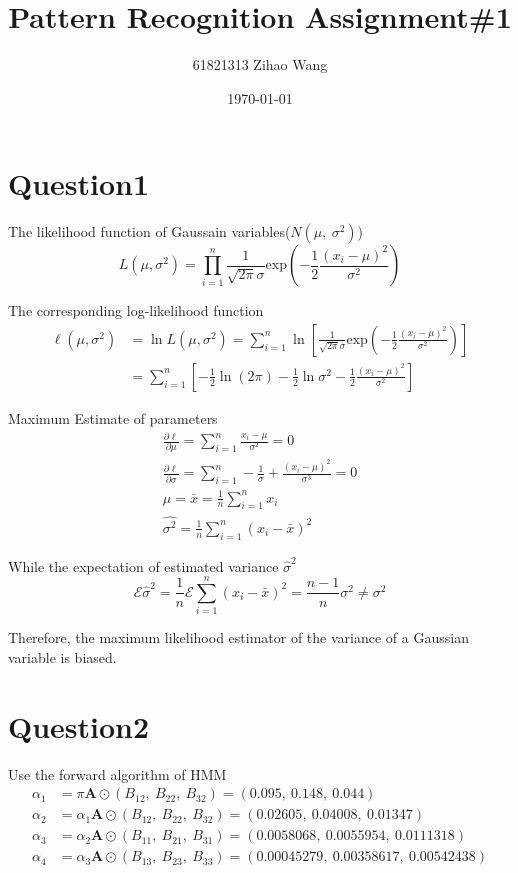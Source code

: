 \documentclass{article}
\title{Pattern Recognition Assignment\#1}
\author{61821313 Zihao Wang}
\date{\today}
\begin{document}
\maketitle

\section*{Question1}

The likelihood function of Gaussain variables($N(\mu,\ \sigma^2)$)
$$
L(\mu, \sigma^2) = \prod_{i = 1}^{n} \frac{1}{\sqrt{2\pi} \sigma} 
\mathrm{exp}(-\frac{1}{2} \frac{(x_{i} - \mu)^2}{\sigma^2})
$$

The corresponding log-likelihood function
\begin{align*}
    \ell(\mu, \sigma^2) &= \ln L(\mu, \sigma^2) = \sum_{i = 1}^{n} \ln \left[
    \frac{1}{\sqrt{2\pi}\sigma} \mathrm{exp}(-\frac{1}{2} \frac{(x_{i} - \mu)^2}{\sigma^2})
    \right] \\[5mm]
    &= \sum_{i = 1}^{n} \left[
        -\frac{1}{2}\ln(2\pi) - \frac{1}{2}\ln\sigma^2 - \frac{1}{2} \frac{(x_{i} - \mu)^2}{\sigma^2}
    \right]
\end{align*}

Maximum Estimate of parameters
\begin{gather*}
    \frac{\partial \ell}{\partial \mu} = \sum_{i = 1}^{n} 
    \frac{x_{i} - \mu}{\sigma^2} = 0 \\[5mm]
    \frac{\partial \ell}{\partial \sigma} = \sum_{i = 1}^{n} 
    -\frac{1}{\sigma} + \frac{(x_{i} - \mu)^2}{\sigma^3} = 0 \\[5mm]
    \hat{\mu} =  \bar{x} = \frac{1}{n} \sum_{i = 1}^{n} x_{i} \\[5mm]
    \hat{\sigma^2} = \frac{1}{n} \sum_{i = 1}^{n} (x_{i} - \bar{x})^2
\end{gather*}

While the expectation of estimated variance $\hat{\sigma}^2$
$$
\mathcal{E} \hat{\sigma}^2 = \frac{1}{n} \mathcal{E} \sum_{i = 1}^{n} (x_{i} - \bar{x})^2 
= \frac{n - 1}{n} \sigma^2 \ne \sigma^2
$$

Therefore, the maximum likelihood estimator of the variance of a Gaussian variable is biased.

\section*{Question2}

Use the forward algorithm of HMM
\begin{align*}
    \alpha_{1} &= \pi \mathbf{A} \odot (B_{12},\ B_{22},\ B_{32}) 
                = (0.095,\ 0.148,\ 0.044) \\[5mm]
    \alpha_{2} &= \alpha_{1} \mathbf{A} \odot (B_{12},\ B_{22},\ B_{32}) 
                = (0.02605,\ 0.04008,\ 0.01347) \\[5mm]
    \alpha_{3} &= \alpha_{2} \mathbf{A} \odot (B_{11},\ B_{21},\ B_{31}) 
                = (0.0058068,\ 0.0055954,\ 0.0111318) \\[5mm]
    \alpha_{4} &= \alpha_{3} \mathbf{A} \odot (B_{13},\ B_{23},\ B_{33}) 
                = (0.00045279,\ 0.00358617,\ 0.00542438)
\end{align*}
\end{document}
